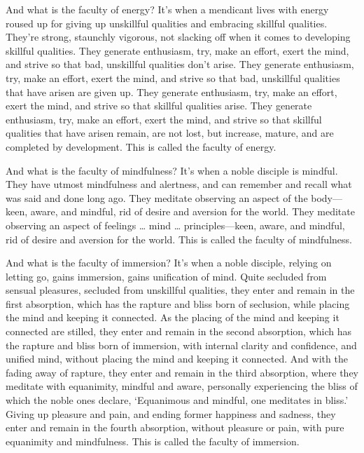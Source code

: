 \documentclass[12pt,openany]{book}%
\begin{document}
And what is the faculty of energy? It’s when a mendicant lives with energy roused up for giving up unskillful qualities and embracing skillful qualities. They’re strong, staunchly vigorous, not slacking off when it comes to developing skillful qualities. They generate enthusiasm, try, make an effort, exert the mind, and strive so that bad, unskillful qualities don’t arise. They generate enthusiasm, try, make an effort, exert the mind, and strive so that bad, unskillful qualities that have arisen are given up. They generate enthusiasm, try, make an effort, exert the mind, and strive so that skillful qualities arise. They generate enthusiasm, try, make an effort, exert the mind, and strive so that skillful qualities that have arisen remain, are not lost, but increase, mature, and are completed by development. This is called the faculty of energy. 

And what is the faculty of mindfulness? It’s when a noble disciple is mindful. They have utmost mindfulness and alertness, and can remember and recall what was said and done long ago. They meditate observing an aspect of the body—keen, aware, and mindful, rid of desire and aversion for the world. They meditate observing an aspect of feelings … mind … principles—keen, aware, and mindful, rid of desire and aversion for the world. This is called the faculty of mindfulness. 

And what is the faculty of immersion? It’s when a noble disciple, relying on letting go, gains immersion, gains unification of mind. Quite secluded from sensual pleasures, secluded from unskillful qualities, they enter and remain in the first absorption, which has the rapture and bliss born of seclusion, while placing the mind and keeping it connected. As the placing of the mind and keeping it connected are stilled, they enter and remain in the second absorption, which has the rapture and bliss born of immersion, with internal clarity and confidence, and unified mind, without placing the mind and keeping it connected. And with the fading away of rapture, they enter and remain in the third absorption, where they meditate with equanimity, mindful and aware, personally experiencing the bliss of which the noble ones declare, ‘Equanimous and mindful, one meditates in bliss.’ Giving up pleasure and pain, and ending former happiness and sadness, they enter and remain in the fourth absorption, without pleasure or pain, with pure equanimity and mindfulness. This is called the faculty of immersion. 
\end{document}
